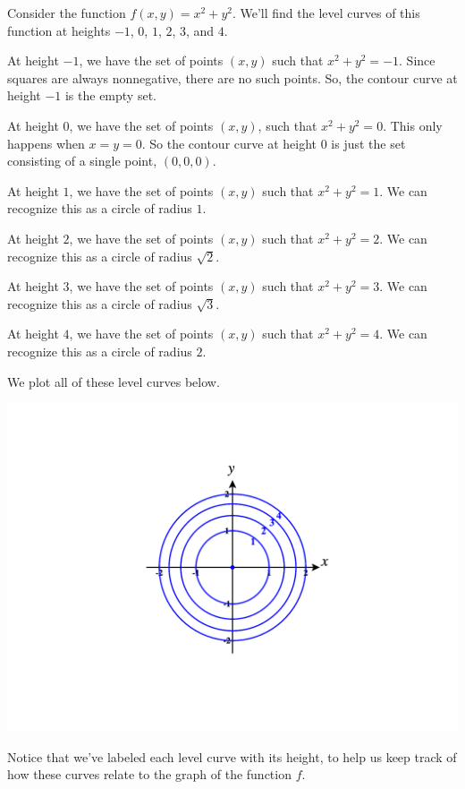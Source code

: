 \documentclass{ximera}
\begin{document}
\begin{example}
Consider the function $f(x,y) = x^2+y^2$. We'll find the level curves of this function at heights $-1$, $0$, $1$, $2$, $3$, and $4$.

At height $-1$, we have the set of points $(x,y)$ such that $x^2+y^2=-1$. Since squares are always nonnegative, there are no such points. So, the contour curve at height $-1$ is the empty set.

At height $0$, we have the set of points $(x,y)$, such that $x^2+y^2=0$. This only happens when $x=y=0$. So the contour curve at height $0$ is just the set consisting of a single point, $(0,0,0)$.

At height $1$, we have the set of points $(x,y)$ such that $x^2+y^2=1$. We can recognize this as a circle of radius $1$.

At height $2$, we have the set of points $(x,y)$ such that $x^2+y^2=2$. We can recognize this as a circle of radius $\sqrt{2}$.

At height $3$, we have the set of points $(x,y)$ such that $x^2+y^2=3$. We can recognize this as a circle of radius $\sqrt{3}$.

At height $4$, we have the set of points $(x,y)$ such that $x^2+y^2=4$. We can recognize this as a circle of radius $2$.

We plot all of these level curves below.

\begin{image}
\includegraphics[width = \textwidth]{CalcPlot3D-level_sets}
\end{image}

Notice that we've labeled each level curve with its height, to help us keep track of how these curves relate to the graph of the function $f$.
\end{example}
\end{document}
